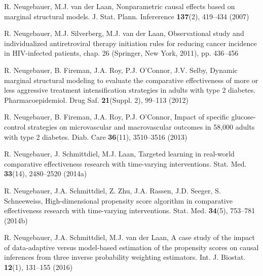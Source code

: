 \begin{list}{}{\setlength{\leftmargin}{2.1em}\setlength{\labelwidth}{0pt}
  \setlength{\labelsep}{0pt}\setlength{\itemindent}{-2.1em}
  \setlength{\parsep}{0pt}\setlength{\itemsep}{2pt}\setlength{\topsep}{0pt}}
\item\label{refentry:REF245}R. Neugebauer, M.J. van der Laan, Nonparametric causal effects based on marginal structural models. J. Stat. Plann. Infererence \textbf{137}(2), 419--434 (2007)\label{refend:REF245}
\item\label{refentry:REF246}R. Neugebauer, M.J. Silverberg, M.J. van der Laan, Observational study and individualized antiretroviral therapy initiation rules for reducing cancer incidence in HIV-infected patients, chap. 26 (Springer, New York, 2011), pp. 436--456\label{refend:REF246}
\item\label{refentry:REF247}R. Neugebauer, B. Fireman, J.A. Roy, P.J. O'Connor, J.V. Selby, Dynamic marginal structural modeling to evaluate the comparative effectiveness of more or less aggressive treatment intensification strategies in adults with type 2 diabetes. Pharmacoepidemiol. Drug Saf. \textbf{21}(Suppl. 2), 99--113 (2012)\label{refend:REF247}
\item\label{refentry:REF248}R. Neugebauer, B. Fireman, J.A. Roy, P.J. O'Connor, Impact of specific glucose-control strategies on microvascular and macrovascular outcomes in 58,000 adults with type 2 diabetes. Diab. Care \textbf{36}(11), 3510--3516 (2013)\label{refend:REF248}
\item\label{refentry:REF249}R. Neugebauer, J. Schmittdiel, M.J. Laan, Targeted learning in real-world comparative effectiveness research with time-varying interventions. Stat. Med. \textbf{33}(14), 2480--2520 (2014a)\label{refend:REF249}
\item\label{refentry:REF250}R. Neugebauer, J.A. Schmittdiel, Z. Zhu, J.A. Rassen, J.D. Seeger, S. Schneeweiss, High-dimensional propensity score algorithm in comparative effectiveness research with time-varying interventions. Stat. Med. \textbf{34}(5), 753--781 (2014b)\label{refend:REF250}
\item\label{refentry:REF251}R. Neugebauer, J.A. Schmittdiel, M.J. van der Laan, A case study of the impact of data-adaptive versus model-based estimation of the propensity scores on causal inferences from three inverse probability weighting estimators. Int. J. Biostat. \textbf{12}(1), 131--155 (2016)\label{refend:REF251}

\end{list}
